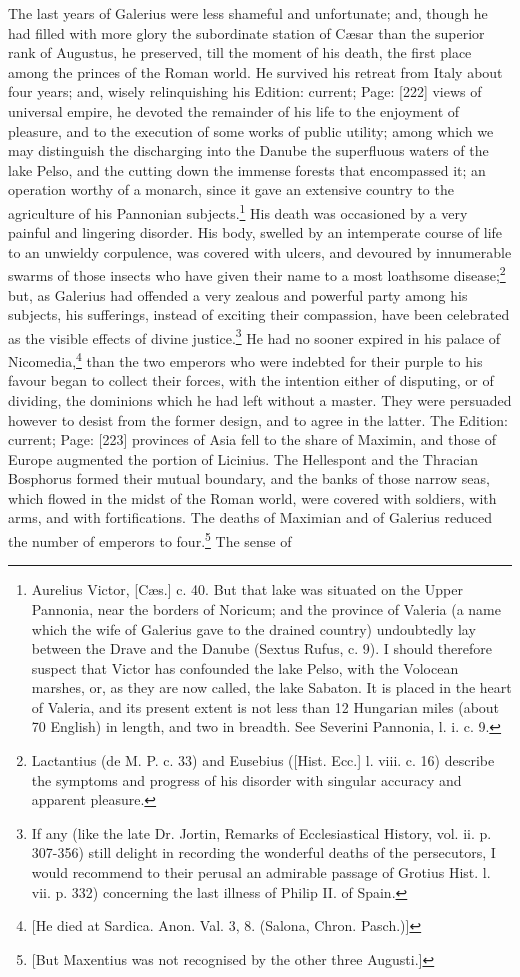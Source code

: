The last years of Galerius were less shameful and unfortunate; and, though he had filled with more glory the subordinate station of Cæsar than the superior rank of Augustus, he preserved, till the moment of his death, the first place among the princes of the Roman world. He survived his retreat from Italy about four years; and, wisely relinquishing his Edition: current; Page: [222] views of universal empire, he devoted the remainder of his life to the enjoyment of pleasure, and to the execution of some works of public utility; among which we may distinguish the discharging into the Danube the superfluous waters of the lake Pelso, and the cutting down the immense forests that encompassed it; an operation worthy of a monarch, since it gave an extensive country to the agriculture of his Pannonian subjects.\footnote{Aurelius Victor, [Cæs.] c. 40. But that lake was situated on the Upper Pannonia, near the borders of Noricum; and the province of Valeria (a name which the wife of Galerius gave to the drained country) undoubtedly lay between the Drave and the Danube (Sextus Rufus, c. 9). I should therefore suspect that Victor has confounded the lake Pelso, with the Volocean marshes, or, as they are now called, the lake Sabaton. It is placed in the heart of Valeria, and its present extent is not less than 12 Hungarian miles (about 70 English) in length, and two in breadth. See Severini Pannonia, l. i. c. 9.} His death was occasioned by a very painful and lingering disorder. His body, swelled by an intemperate course of life to an unwieldy corpulence, was covered with ulcers, and devoured by innumerable swarms of those insects who have given their name to a most loathsome disease;\footnote{Lactantius (de M. P. c. 33) and Eusebius ([Hist. Ecc.] l. viii. c. 16) describe the symptoms and progress of his disorder with singular accuracy and apparent pleasure.} but, as Galerius had offended a very zealous and powerful party among his subjects, his sufferings, instead of exciting their compassion, have been celebrated as the visible effects of divine justice.\footnote{If any (like the late Dr. Jortin, Remarks of Ecclesiastical History, vol. ii. p. 307-356) still delight in recording the wonderful deaths of the persecutors, I would recommend to their perusal an admirable passage of Grotius Hist. l. vii. p. 332) concerning the last illness of Philip II. of Spain.} He had no sooner expired in his palace of Nicomedia,\footnote{[He died at Sardica. Anon. Val. 3, 8. (Salona, Chron. Pasch.)]} than the two emperors who were indebted for their purple to his favour began to collect their forces, with the intention either of disputing, or of dividing, the dominions which he had left without a master. They were persuaded however to desist from the former design, and to agree in the latter. The Edition: current; Page: [223] provinces of Asia fell to the share of Maximin, and those of Europe augmented the portion of Licinius. The Hellespont and the Thracian Bosphorus formed their mutual boundary, and the banks of those narrow seas, which flowed in the midst of the Roman world, were covered with soldiers, with arms, and with fortifications. The deaths of Maximian and of Galerius reduced the number of emperors to four.\footnote{[But Maxentius was not recognised by the other three Augusti.]} The sense of 